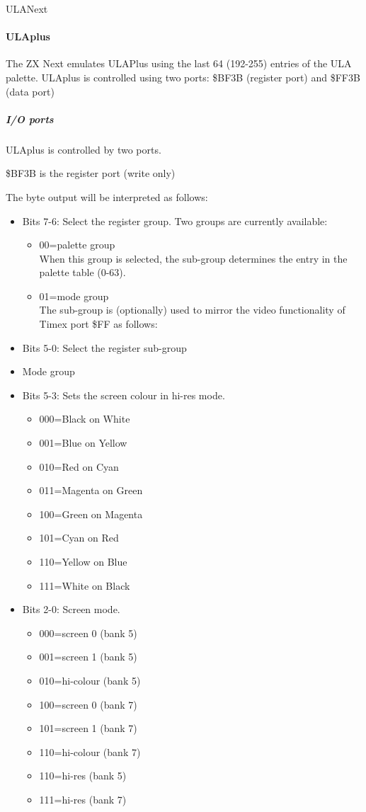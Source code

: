 \begin{table}[h]\centering
  \caption{ULANext}
\end{table}

\paragraph{ULAplus}
The ZX Next emulates ULAPlus using the last 64 (192-255) entries of
the ULA palette. ULAplus is controlled using two ports: \$BF3B (register
port) and \$FF3B (data port)

\subparagraph{I/O ports}
ULAplus is controlled by two ports.

\$BF3B is the register port (write only)

The byte output will be interpreted as follows:
\begin{itemize}
\item Bits 7-6: Select the register group. Two groups are currently available:
  \begin{itemize}
  \item 00=palette group\\
    When this group is selected, the sub-group determines the entry in the
    palette table (0-63).
  \item 01=mode group\\
    The sub-group is (optionally) used to mirror the video functionality
    of Timex port \$FF as follows:
  \end{itemize}
\item Bits 5-0: Select the register sub-group
\item[] Mode group
\item Bits 5-3: Sets the screen colour in hi-res mode.
  \begin{itemize}
  \item 000=Black on White
  \item 001=Blue on Yellow
  \item 010=Red on Cyan
  \item 011=Magenta on Green
  \item 100=Green on Magenta
  \item 101=Cyan on Red
  \item 110=Yellow on Blue
  \item 111=White on Black
  \end{itemize}
\item Bits 2-0: Screen mode.
  \begin{itemize}
  \item 000=screen 0 (bank 5)
  \item 001=screen 1 (bank 5)
  \item 010=hi-colour (bank 5)
  \item 100=screen 0 (bank 7)
  \item 101=screen 1 (bank 7)
  \item 110=hi-colour (bank 7)
  \item 110=hi-res (bank 5)
  \item 111=hi-res (bank 7)
  \end{itemize}
\end{itemize}

